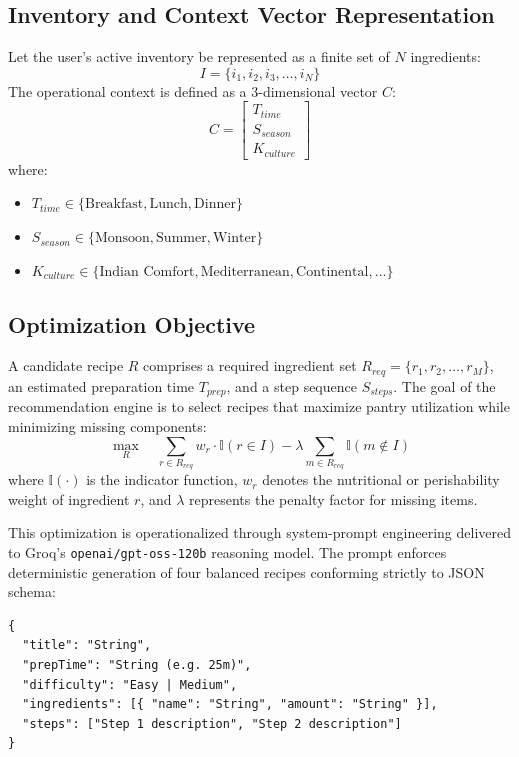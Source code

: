 \subsection*{Inventory and Context Vector Representation}
Let the user's active inventory be represented as a finite set of $N$ ingredients:
\begin{equation}
I = \{ i_1, i_2, i_3, \ldots, i_N \}
\end{equation}
The operational context is defined as a 3-dimensional vector $C$:
\begin{equation}
C = \begin{bmatrix} T_{time} \\ S_{season} \\ K_{culture} \end{bmatrix}
\end{equation}
where:
\begin{itemize}
    \item $T_{time} \in \{ \text{Breakfast}, \text{Lunch}, \text{Dinner} \}$
    \item $S_{season} \in \{ \text{Monsoon}, \text{Summer}, \text{Winter} \}$
    \item $K_{culture} \in \{ \text{Indian Comfort}, \text{Mediterranean}, \text{Continental}, \ldots \}$
\end{itemize}

\subsection*{Optimization Objective}
A candidate recipe $R$ comprises a required ingredient set $R_{req} = \{ r_1, r_2, \ldots, r_M \}$, an estimated preparation time $T_{prep}$, and a step sequence $S_{steps}$. The goal of the recommendation engine is to select recipes that maximize pantry utilization while minimizing missing components:
\begin{equation}
\max_{R} \quad \sum_{r \in R_{req}} w_r \cdot \mathbb{I}(r \in I) - \lambda \sum_{m \in R_{req}} \mathbb{I}(m \notin I)
\end{equation}
where $\mathbb{I}(\cdot)$ is the indicator function, $w_r$ denotes the nutritional or perishability weight of ingredient $r$, and $\lambda$ represents the penalty factor for missing items.

This optimization is operationalized through system-prompt engineering delivered to Groq's \texttt{openai/gpt-oss-120b} reasoning model. The prompt enforces deterministic generation of four balanced recipes conforming strictly to JSON schema:
\begin{lstlisting}
{
  "title": "String",
  "prepTime": "String (e.g. 25m)",
  "difficulty": "Easy | Medium",
  "ingredients": [{ "name": "String", "amount": "String" }],
  "steps": ["Step 1 description", "Step 2 description"]
}
\end{lstlisting}

